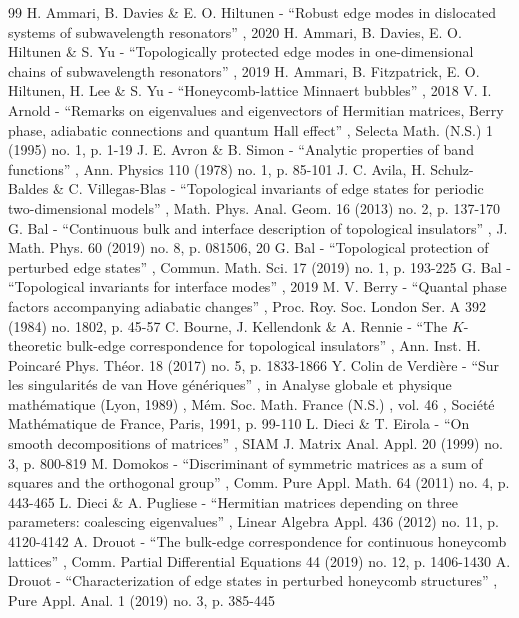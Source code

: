 \documentclass[10pt]{amsart}
\theoremstyle{definition}
\begin{document}
\begin{thebibliography}{99}
 H. Ammari, B. Davies \& E. O. Hiltunen - “Robust edge modes in dislocated systems of subwavelength resonators” , 2020
 H. Ammari, B. Davies, E. O. Hiltunen \& S. Yu - “Topologically protected edge modes in one-dimensional chains of subwavelength resonators” , 2019
 H. Ammari, B. Fitzpatrick, E. O. Hiltunen, H. Lee \& S. Yu - “Honeycomb-lattice Minnaert bubbles” , 2018
 V. I. Arnold - “Remarks on eigenvalues and eigenvectors of Hermitian matrices, Berry phase, adiabatic connections and quantum Hall effect” , Selecta Math. (N.S.) 1 (1995) no. 1, p. 1-19
 J. E. Avron \& B. Simon - “Analytic properties of band functions” , Ann. Physics 110 (1978) no. 1, p. 85-101
 J. C. Avila, H. Schulz-Baldes \& C. Villegas-Blas - “Topological invariants of edge states for periodic two-dimensional models” , Math. Phys. Anal. Geom. 16 (2013) no. 2, p. 137-170
 G. Bal - “Continuous bulk and interface description of topological insulators” , J. Math. Phys. 60 (2019) no. 8, p. 081506, 20
 G. Bal - “Topological protection of perturbed edge states” , Commun. Math. Sci. 17 (2019) no. 1, p. 193-225
 G. Bal - “Topological invariants for interface modes” , 2019
 M. V. Berry - “Quantal phase factors accompanying adiabatic changes” , Proc. Roy. Soc. London Ser. A 392 (1984) no. 1802, p. 45-57
 C. Bourne, J. Kellendonk \& A. Rennie - “The $K$-theoretic bulk-edge correspondence for topological insulators” , Ann. Inst. H. Poincaré Phys. Théor. 18 (2017) no. 5, p. 1833-1866
 Y. Colin de Verdière - “Sur les singularités de van Hove génériques” , in Analyse globale et physique mathématique (Lyon, 1989) , Mém. Soc. Math. France (N.S.) , vol. 46 , Société Mathématique de France, Paris, 1991, p. 99-110
 L. Dieci \& T. Eirola - “On smooth decompositions of matrices” , SIAM J. Matrix Anal. Appl. 20 (1999) no. 3, p. 800-819
 M. Domokos - “Discriminant of symmetric matrices as a sum of squares and the orthogonal group” , Comm. Pure Appl. Math. 64 (2011) no. 4, p. 443-465
 L. Dieci \& A. Pugliese - “Hermitian matrices depending on three parameters: coalescing eigenvalues” , Linear Algebra Appl. 436 (2012) no. 11, p. 4120-4142
 A. Drouot - “The bulk-edge correspondence for continuous honeycomb lattices” , Comm. Partial Differential Equations 44 (2019) no. 12, p. 1406-1430
 A. Drouot - “Characterization of edge states in perturbed honeycomb structures” , Pure Appl. Anal. 1 (2019) no. 3, p. 385-445

\end{thebibliography}
\end{document}
